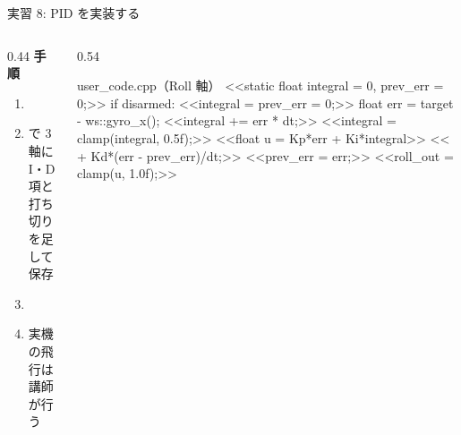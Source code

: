 \begin{frame}[fragile]{実習 8: PID を実装する}
  \begin{columns}[T]
    \begin{column}{0.44\textwidth}
      {\footnotesize\textbf{\textcolor{sfblue}{手順}}}\par\vspace{-2pt}
        \footnotesize
        \begin{enumerate}\setlength{\itemsep}{0pt}
          \item {}
          \item {} で 3 軸に I・D 項と打ち切りを足して保存
          \item {}
          \item 実機の飛行は講師が行う
        \end{enumerate}
    \end{column}
    \begin{column}{0.54\textwidth}
      \begin{sflisting}[basicstyle=\ttfamily\scriptsize, moredelim={[is][\bfseries\color{sfred}]{<<}{>>}}]{user\_code.cpp（Roll 軸）}
<<static float integral = 0, prev_err = 0;>>
if disarmed: <<integral = prev_err = 0;>>
float err = target - ws::gyro_x();
<<integral += err * dt;>>
<<integral = clamp(integral, 0.5f);>>
<<float u = Kp*err + Ki*integral>>
<<  + Kd*(err - prev_err)/dt;>>
<<prev_err = err;>>
<<roll_out = clamp(u, 1.0f);>>
      \end{sflisting}
    \end{column}
  \end{columns}
\end{frame}


